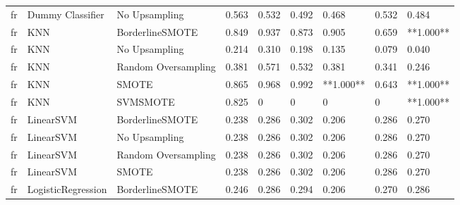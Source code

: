 \begin{tabular}{lllllllll}
      fr &             Dummy Classifier &       No Upsampling & 0.563 &                     0.532 &                 0.492 &                  0.468 &                                   0.532 &     0.484 \\
      fr &                          KNN &     BorderlineSMOTE & 0.849 &                     0.937 &                 0.873 &                  0.905 &                                   0.659 & **1.000** \\
      fr &                          KNN &       No Upsampling & 0.214 &                     0.310 &                 0.198 &                  0.135 &                                   0.079 &     0.040 \\
      fr &                          KNN & Random Oversampling & 0.381 &                     0.571 &                 0.532 &                  0.381 &                                   0.341 &     0.246 \\
      fr &                          KNN &               SMOTE & 0.865 &                     0.968 &                 0.992 &              **1.000** &                                   0.643 & **1.000** \\
      fr &                          KNN &            SVMSMOTE & 0.825 &                         0 &                     0 &                      0 &                                       0 & **1.000** \\
      fr &                    LinearSVM &     BorderlineSMOTE & 0.238 &                     0.286 &                 0.302 &                  0.206 &                                   0.286 &     0.270 \\
      fr &                    LinearSVM &       No Upsampling & 0.238 &                     0.286 &                 0.302 &                  0.206 &                                   0.286 &     0.270 \\
      fr &                    LinearSVM & Random Oversampling & 0.238 &                     0.286 &                 0.302 &                  0.206 &                                   0.286 &     0.270 \\
      fr &                    LinearSVM &               SMOTE & 0.238 &                     0.286 &                 0.302 &                  0.206 &                                   0.286 &     0.270 \\
      fr &           LogisticRegression &     BorderlineSMOTE & 0.246 &                     0.286 &                 0.294 &                  0.206 &                                   0.270 &     0.286 \\

\end{tabular}
